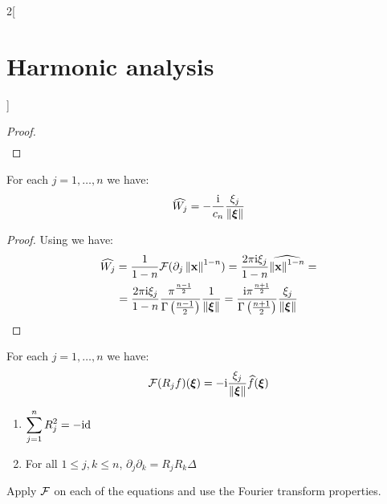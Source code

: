 \documentclass[../../../main_math.tex]{subfiles}
\begin{document}
\begin{multicols}{2}[\section{Harmonic analysis}]
\begin{proof}
\begin{align*}
    \end{align*}
  \end{proof}
  \begin{theorem}
    For each $j=1, \ldots, n$ we have: $$\widehat{W_j}=-\frac{\mathrm{i}}{c_n}\frac{\xi_j}{\left\|\boldsymbol{\mathrm{\xi}}\right\|}$$
  \end{theorem}
  \begin{proof}
    Using  we have:
    \begin{multline*}
      \widehat{W_j}=\frac{1}{1-n}\mathcal{F}{(\partial_j\left\|\boldsymbol{\mathrm{x}}\right\|^{1-n})}=\frac{2\pi\mathrm{i}\xi_j}{1-n} \widehat{\left\|\boldsymbol{\mathrm{x}}\right\|^{1-n}}=\\=\frac{2\pi\mathrm{i}\xi_j}{1-n}\frac{\pi^{\frac{n-1}{2}}}{\Gamma\left(\frac{n-1}{2}\right)}\frac{1}{\left\|\boldsymbol{\mathrm{\xi}}\right\|}=\frac{\mathrm{i}\pi^{\frac{n+1}{2}}}{\Gamma\left(\frac{n+1}{2}\right)}\frac{\xi_j}{\left\|\boldsymbol{\mathrm{\xi}}\right\|}
    \end{multline*}
  \end{proof}
  \begin{corollary}
    For each $j=1, \ldots, n$ we have: $$\mathcal{F}{(R_jf)}(\boldsymbol{\mathrm{\xi}})=-\mathrm{i}\frac{\xi_j}{\left\|\boldsymbol{\mathrm{\xi}}\right\|} \widehat{f}(\boldsymbol{\mathrm{\xi}})$$
  \end{corollary}
  \begin{proposition}\hfill
    \begin{enumerate}
      \item $\displaystyle\sum_{j=1}^{n}R_j^2=-\mathrm{id}$
      \item For all $1\leq j,k\leq n$, $\partial_j\partial_k=R_jR_k\Delta$
    \end{enumerate}
  \end{proposition}
  \begin{sproof}
    Apply $\mathcal{F}$ on each of the equations and use the Fourier transform properties.
  \end{sproof}
\end{multicols}
\end{document}
